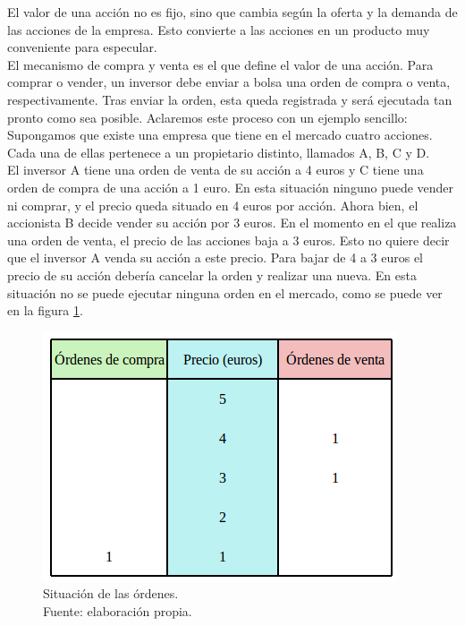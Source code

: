 		El valor de una acci\'on no es fijo, sino que cambia seg\'un la oferta y la demanda de las acciones de la empresa. Esto convierte a las acciones en un producto muy conveniente para especular.\\
		
		El mecanismo de compra y venta es el que define el valor de una acci\'on. Para comprar o vender, un inversor debe enviar a bolsa una orden de compra o venta, respectivamente. Tras enviar la orden, esta queda registrada y ser\'a ejecutada tan pronto como sea posible. Aclaremos este proceso con un ejemplo sencillo:\\
		
		Supongamos que existe una empresa que tiene en el mercado cuatro acciones. Cada una de ellas pertenece a un propietario distinto, llamados A, B, C y D. \\
		
		El inversor A tiene una orden de venta de su acci\'on a 4 euros y C tiene una orden de compra de una acci\'on a 1 euro. En esta situaci\'on ninguno puede vender ni comprar, y el precio queda situado en 4 euros por acci\'on. Ahora bien, el accionista B decide vender su acci\'on por 3 euros. En el momento en el que realiza una orden de venta, el precio de las acciones baja a 3 euros. Esto no quiere decir que el inversor A venda su acci\'on a este precio. Para bajar de 4 a 3 euros el precio de su acci\'on deber\'ia cancelar la orden y realizar una nueva. En esta situaci\'on no se puede ejecutar ninguna orden en el mercado, como se puede ver en la figura \ref{fig:ordenes_ejemplo}.\\
		
				\begin{figure}[H]
					\centering
					\includegraphics[scale=2]{imagenes/ordenes_ejemplo.png}
					\caption[Ejemplo de situaci\'on de las \'ordenes]{Situaci\'on de las \'ordenes.\\ Fuente: elaboraci\'on propia.}
					\label{fig:ordenes_ejemplo}
				\end{figure}
		
